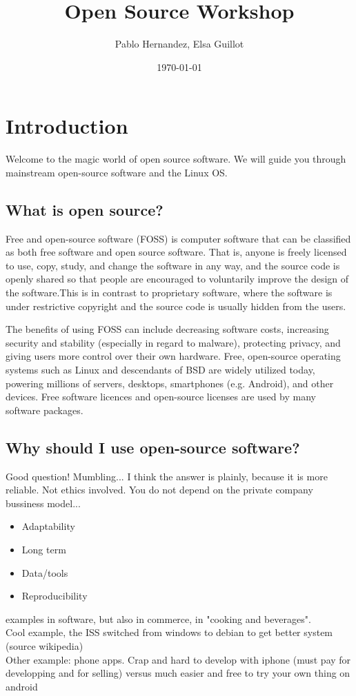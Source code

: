 \documentclass[a4paper]{article}
\title{Open Source Workshop}
\author{Pablo Hernandez, Elsa Guillot}
\date{\today}
\begin{document}
\maketitle



\section{Introduction}

Welcome to the magic world of open source software. We will guide you through mainstream open-source software and the Linux OS.
\subsection{What is open source?}

Free and open-source software (FOSS) is computer software that can be classified as both free software and open source software. That is, anyone is freely licensed to use, copy, study, and change the software in any way, and the source code is openly shared so that people are encouraged to voluntarily improve the design of the software.This is in contrast to proprietary software, where the software is under restrictive copyright and the source code is usually hidden from the users.

The benefits of using FOSS can include decreasing software costs, increasing security and stability (especially in regard to malware), protecting privacy, and giving users more control over their own hardware. Free, open-source operating systems such as Linux and descendants of BSD are widely utilized today, powering millions of servers, desktops, smartphones (e.g. Android), and other devices. Free software licences and open-source licenses are used by many software packages.

\subsection{Why should I use open-source software?}
Good question! Mumbling...
I think the answer is plainly, because it is more reliable. Not ethics involved. You do not depend on the private company bussiness model...
\begin{itemize}
\item Adaptability
\item Long term 
\item Data/tools
\item Reproducibility 

\end{itemize}
examples in software, but also in commerce, in "cooking and beverages". \\
Cool example, the ISS switched from windows to debian to get better system (source wikipedia)\\
Other example: phone apps. Crap and hard to develop with iphone (must pay for developping and for selling) versus much easier and free to try your own thing on android
\end{document}
